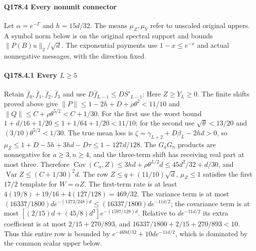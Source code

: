 \paragraph{Q178.4 Every nonunit connector}\label{part:Q178.4}
Let $\alpha=\allowbreak e^{-\Gamma}$ and $h=\allowbreak 15d/32$.
The means $\mu_Z,\allowbreak \mu_Y$ refer to unscaled original uppers.
A symbol norm below is on the original spectral support and bounds
$\|P(B)u\|_2/\sqrt d$. The exponential payments use
$1-x\le\allowbreak  e^{-x}$ and actual nonnegative messages, with the direction fixed.

\paragraph{Q178.4.1 Every $L\ge\allowbreak 5$}
Retain $\bar f_0,\allowbreak \bar f_1,\allowbreak \bar f_2,\allowbreak \bar f_3$ and use
$D\bar f_{L-1}\le\allowbreak  DS'_{L-1}$:
Here $Z\ge\allowbreak  Y_L\ge\allowbreak 0$.
The finite shifts proved above give
$\|P\|\le\allowbreak 1-2h+D+\rho\theta^2<\allowbreak 11/10$ and
$\|Q\|\le\allowbreak  C+\rho\theta^{5/2}<\allowbreak C+1/30$.
For the first use the worst bound
$1+d/16+1/20\le\allowbreak 1+1/64+1/20<\allowbreak 11/10$;
for the second use $\sqrt\theta<\allowbreak 13/20$ and
$(3/10)\theta^{5/2}<\allowbreak 1/30$.
The true mean loss is
$\zeta=\allowbreak \gamma_{L+2}+D\beta_L-2hd>\allowbreak 0$, so
$\mu_Z\le\allowbreak 1+D-5h+3hd-D\tau\le\allowbreak 1-127d/128$.
The $G_aG_n$ products are nonnegative for $a\ge\allowbreak 3,\allowbreak n\ge\allowbreak 4$,
and the three-term shift has receiving real part at most three.
Therefore
$\operatorname{Cov}(C_a,Z)\le3hd+\rho\theta^{L/2}d
\le45d^2/32+d/30$,
and $\operatorname{Var}Z\le\allowbreak (C+1/30)^2d$.
The row $Z\le\allowbreak  q+(11/10)\sqrt d$, $\mu_Z\le\allowbreak 1$ satisfies the first
$17/2$ template for $W=\allowbreak \alpha Z$.
The first-term rate is at least
$4(19/8)+19/16+4(127/128)=\allowbreak 469/32$.
The variance term is at most
$(16337/1800)d e^{-(1373/248)d}\le\allowbreak (16337/1800)de^{-11d/2}$;
the covariance term is at most
$[(2/15)d+(45/8)d^2]e^{-(1597/128)d}$.
Relative to $de^{-11d/2}$ its extra coefficient is at most
$2/15+270/893$, and $16337/1800+2/15+270/893<\allowbreak 10$.
Thus this entire row is bounded by $e^{-469d/32}+10de^{-11d/2}$,
which is dominated by the common scalar upper below.

